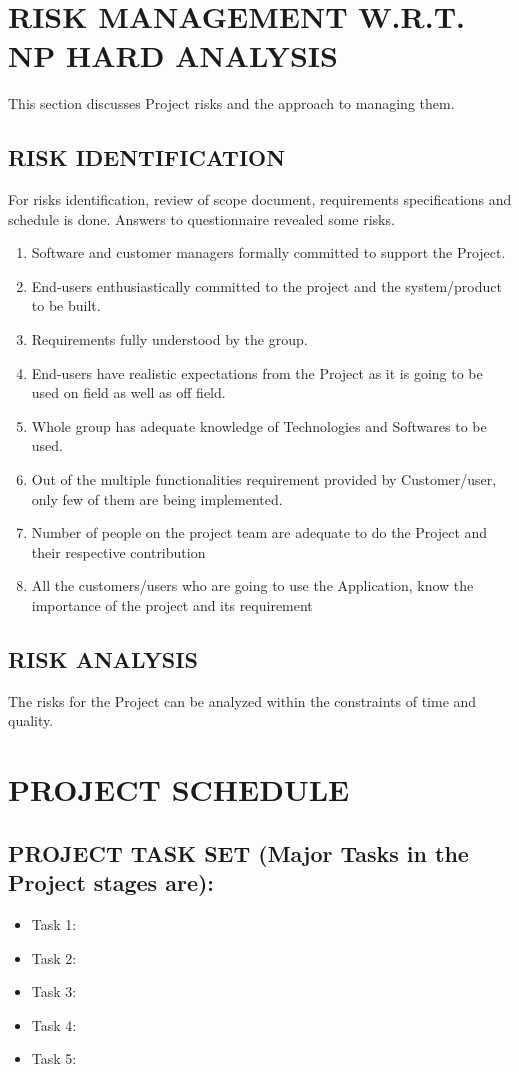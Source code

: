\documentclass[12pt,a4paper]{report}
\begin{document}
\section{RISK MANAGEMENT W.R.T. NP HARD ANALYSIS}
This section discusses Project risks and the approach to managing them.  
\subsection{RISK IDENTIFICATION}
For risks identification, review of scope document, requirements specifications and schedule is done.  Answers to questionnaire revealed some risks. 
\begin{enumerate}
\item Software and customer managers formally committed to support the Project.  
\item End-users enthusiastically committed to the project and the system/product to be built.  
\item Requirements fully understood by the  group.  
\item End-users have realistic expectations from the Project as it is going to be used on field as well as off field.  
\item Whole group has adequate knowledge of Technologies and Softwares to be used.  
\item Out of the multiple functionalities requirement provided by Customer/user, only few of them are being implemented.  
\item Number of people on the project team are adequate to do the Project and their respective contribution  
\item All the customers/users who are going to use the Application, know the importance of the project and its requirement
\end{enumerate}
\newpage
\subsection{RISK ANALYSIS}
The risks for the Project can be analyzed within the constraints of time and quality.  



\newpage

\section{PROJECT SCHEDULE}
\subsection{PROJECT TASK SET (Major Tasks in the Project stages are):}
\begin{itemize}
\item Task 1:
\item Task 2:
\item Task 3:
\item Task 4:
\item Task 5:
\end{itemize}
\end{document}
